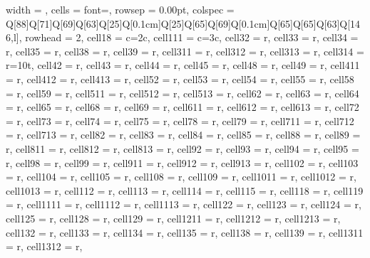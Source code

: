 \begin{landscape}
\begin{longtblr}[
  caption = {Changes in average values and effects differences significance from post hoc analysis.},
  label = {tab:appendix_LCBM_all_results_post_hocs}
]{
  width = \linewidth,
  cells = {font=\fontsize{7.5}{9}\selectfont},
  rowsep = 0.00pt,
  colspec = {Q[88]Q[71]Q[69]Q[63]Q[25]Q[0.1cm]Q[25]Q[65]Q[69]Q[0.1cm]Q[65]Q[65]Q[63]Q[146,l]},
  rowhead = 2,
  cell{1}{8} = {c=2}{c},
  cell{1}{11} = {c=3}{c},
  cell{3}{2} = {r},
  cell{3}{3} = {r},
  cell{3}{4} = {r},
  cell{3}{5} = {r},
  cell{3}{8} = {r},
  cell{3}{9} = {r},
  cell{3}{11} = {r},
  cell{3}{12} = {r},
  cell{3}{13} = {r},
  cell{3}{14} = {r=10}{t},
  cell{4}{2} = {r},
  cell{4}{3} = {r},
  cell{4}{4} = {r},
  cell{4}{5} = {r},
  cell{4}{8} = {r},
  cell{4}{9} = {r},
  cell{4}{11} = {r},
  cell{4}{12} = {r},
  cell{4}{13} = {r},
  cell{5}{2} = {r},
  cell{5}{3} = {r},
  cell{5}{4} = {r},
  cell{5}{5} = {r},
  cell{5}{8} = {r},
  cell{5}{9} = {r},
  cell{5}{11} = {r},
  cell{5}{12} = {r},
  cell{5}{13} = {r},
  cell{6}{2} = {r},
  cell{6}{3} = {r},
  cell{6}{4} = {r},
  cell{6}{5} = {r},
  cell{6}{8} = {r},
  cell{6}{9} = {r},
  cell{6}{11} = {r},
  cell{6}{12} = {r},
  cell{6}{13} = {r},
  cell{7}{2} = {r},
  cell{7}{3} = {r},
  cell{7}{4} = {r},
  cell{7}{5} = {r},
  cell{7}{8} = {r},
  cell{7}{9} = {r},
  cell{7}{11} = {r},
  cell{7}{12} = {r},
  cell{7}{13} = {r},
  cell{8}{2} = {r},
  cell{8}{3} = {r},
  cell{8}{4} = {r},
  cell{8}{5} = {r},
  cell{8}{8} = {r},
  cell{8}{9} = {r},
  cell{8}{11} = {r},
  cell{8}{12} = {r},
  cell{8}{13} = {r},
  cell{9}{2} = {r},
  cell{9}{3} = {r},
  cell{9}{4} = {r},
  cell{9}{5} = {r},
  cell{9}{8} = {r},
  cell{9}{9} = {r},
  cell{9}{11} = {r},
  cell{9}{12} = {r},
  cell{9}{13} = {r},
  cell{10}{2} = {r},
  cell{10}{3} = {r},
  cell{10}{4} = {r},
  cell{10}{5} = {r},
  cell{10}{8} = {r},
  cell{10}{9} = {r},
  cell{10}{11} = {r},
  cell{10}{12} = {r},
  cell{10}{13} = {r},
  cell{11}{2} = {r},
  cell{11}{3} = {r},
  cell{11}{4} = {r},
  cell{11}{5} = {r},
  cell{11}{8} = {r},
  cell{11}{9} = {r},
  cell{11}{11} = {r},
  cell{11}{12} = {r},
  cell{11}{13} = {r},
  cell{12}{2} = {r},
  cell{12}{3} = {r},
  cell{12}{4} = {r},
  cell{12}{5} = {r},
  cell{12}{8} = {r},
  cell{12}{9} = {r},
  cell{12}{11} = {r},
  cell{12}{12} = {r},
  cell{12}{13} = {r},
  cell{13}{2} = {r},
  cell{13}{3} = {r},
  cell{13}{4} = {r},
  cell{13}{5} = {r},
  cell{13}{8} = {r},
  cell{13}{9} = {r},
  cell{13}{11} = {r},
  cell{13}{12} = {r},
}
\end{longtblr}
\end{landscape}
